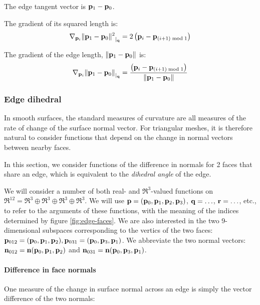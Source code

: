 The edge tangent vector is ${\mathbf p}_1 - {\mathbf p}_0$.

The gradient of its squared length is:
\begin{equation}
{\mathbf \nabla}_{{\mathbf p}_i}{{\| {\mathbf p}_1 - {\mathbf p}_0 \|^2}}_{\mid_{{\mathbf q}}} = 2 \left( {\mathbf p}_i - {\mathbf p}_{(i+1) \bmod 1} \right)
\end{equation}

The gradient of the edge length, $\|{\mathbf p}_1 - {\mathbf p}_0\|$ is:
\begin{equation}
{\mathbf \nabla}_{{\mathbf p}_i}{{\| {\mathbf p}_1 - {\mathbf p}_0 \|}}_{\mid_{{\mathbf q}}} =
\frac{\left( {\mathbf p}_i - {\mathbf p}_{(i+1) \bmod 1} \right)}
{\|{\mathbf p}_1 - {\mathbf p}_0\|}
\end{equation}


\subsubsection{Edge dihedral}
\label{sec:edge_dihedral}

In smooth surfaces,
the standard measures of curvature are all measures
of the rate of change of the surface normal vector.
For triangular meshes, it is therefore natural to
consider functions that depend on the change in
normal vectors between nearby faces.

In this section, we consider functions of the difference
in normals for 2 faces that share an edge,
which is equivalent to the {\it dihedral angle} of the edge.

We will consider a number of both real- and $\Re^3$-valued functions on
$\Re^{12} = \Re^3 \oplus \Re^3 \oplus \Re^3 \oplus \Re^3$.
We will use ${\mathbf p} = ({\mathbf p}_0, {\mathbf p}_1, {\mathbf p}_2, {\mathbf p}_3)$, ${\mathbf q}=\ldots$, ${\mathbf r}=\ldots$, etc.,
to refer to the arguments of these functions, with the meaning
of the indices determined by figure \ref{fig:edge-faces}.
We are also interested in the two 9-dimensional subspaces
corresponding to the vertics of the two faces:
${\mathbf p}_{012} = ({\mathbf p}_0,{\mathbf p}_1,{\mathbf p}_2), {\mathbf p}_{031} = ({\mathbf p}_0,{\mathbf p}_3,{\mathbf p}_1)$.
We abbreviate the two normal vectors:
${\mathbf n}_{012} = {\mathbf n}({\mathbf p}_0,{\mathbf p}_1,{\mathbf p}_2)$
and
${\mathbf n}_{031} = {\mathbf n}({\mathbf p}_0,{\mathbf p}_3,{\mathbf p}_1)$.


\paragraph{Difference in face normals}
\label{sec:normal_difference}

One measure of the change in surface normal across an edge
is simply the vector difference of the two normals:

